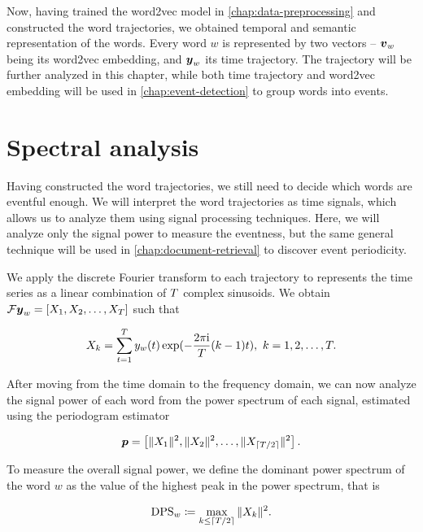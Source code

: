 Now, having trained the word2vec model in \autoref{chap:data-preprocessing} and constructed the word trajectories, we obtained temporal and semantic representation of the words. Every word $w$ is represented by two vectors -- $\embed_{w}$ being its word2vec embedding, and $\vect{\traj}_{w}$ its time trajectory. The trajectory will be further analyzed in this chapter, while both time trajectory and word2vec embedding will be used in \autoref{chap:event-detection} to group words into events.


\section{Spectral analysis}
Having constructed the word trajectories, we still need to decide which words are eventful enough. We will interpret the word trajectories as time signals, which allows us to analyze them using signal processing techniques. Here, we will analyze only the signal power to measure the eventness, but the same general technique will be used in \autoref{chap:document-retrieval} to discover event periodicity.

We apply the discrete Fourier transform to each trajectory to represents the time series as a linear combination of $T$ complex sinusoids. We obtain $\mathcal{F} \vect{\traj}_{w} = \left[ X_{1}, X_{2}, \dots, X_{\streamlen}\right ]$ such that

\begin{equation*}
	X_{k} = \sum_{t = 1}^{T}{y_{w}(t) \exp(- \frac{2 \pi \mathrm{i}}{T} (k - 1) t}), ~ k = 1, 2, \dots, T.
\end{equation*}

After moving from the time domain to the frequency domain, we can now analyze the signal power of each word from the power spectrum of each signal, estimated using the periodogram estimator

\begin{equation*}
	\vect{P} = \left[ \|X_{1}\|^{2}, \|X_{2}\|^{2}, \dots, \|X_{\ceil{\streamlen / 2}}\|^{2} \right].
\end{equation*}

To measure the overall signal power, we define the dominant power spectrum of the word $w$ as the value of the highest peak in the power spectrum, that is

\begin{equation}
	\text{DPS}_{w} \coloneqq \max\limits_{k \leq \lceil T / 2\rceil}{\|X_{k}\|^{2}}.
\end{equation}

